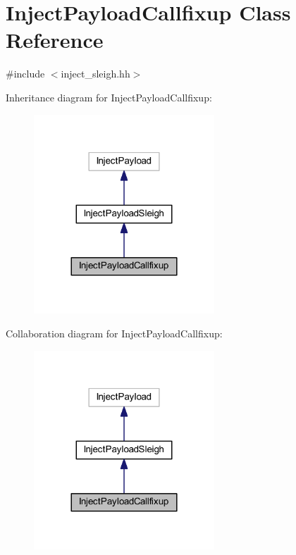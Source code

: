 \hypertarget{class_inject_payload_callfixup}{}\section{Inject\+Payload\+Callfixup Class Reference}
\label{class_inject_payload_callfixup}


{\ttfamily \#include $<$inject\+\_\+sleigh.\+hh$>$}



Inheritance diagram for Inject\+Payload\+Callfixup\+:
\nopagebreak
\begin{figure}[H]
\begin{center}
\leavevmode
\includegraphics[width=192pt]{class_inject_payload_callfixup__inherit__graph}
\end{center}
\end{figure}


Collaboration diagram for Inject\+Payload\+Callfixup\+:
\nopagebreak
\begin{figure}[H]
\begin{center}
\leavevmode
\includegraphics[width=192pt]{class_inject_payload_callfixup__coll__graph}
\end{center}
\end{figure}
